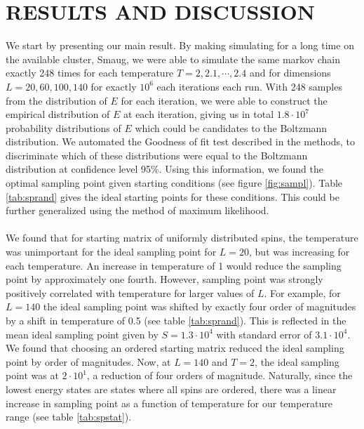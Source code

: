 \documentclass[11pt,english,a4paper]{article}
\begin{document}
\section*{\uppercase{Results and discussion}}
We start by presenting our main result. By making simulating for a long time on the available cluster, Smaug, we were able to simulate the same markov chain exactly 248 times for each temperature $T = 2,2.1,\cdots,2.4$ and for dimensions $L=20,60,100,140$ for exactly $10^6$ each iterations each run. With 248 samples from the distribution of $E$ for each iteration, we were able to construct the empirical distribution of $E$ at each iteration, giving us in total $1.8\cdot 10^7$ probability distributions of $E$ which could be candidates to the Boltzmann distribution. We automated the Goodness of fit test described in the methods, to discriminate which of these distributions were equal to the Boltzmann distribution at confidence level 95\%. Using this information, we found the optimal sampling point given starting conditions (see figure \ref{fig:sampl}). Table \ref{tab:sprand} gives the ideal starting points for these conditions. This could be further generalized using the method of maximum likelihood. \\
\\
We found that for starting matrix of uniformly distributed spins, the temperature was unimportant for the ideal sampling point for $L=20$, but was increasing for each temperature. An increase in temperature of 1 would reduce the sampling point by approximately one fourth. However, sampling point was strongly positively correlated with temperature for larger values of $L$. For example, for $L=140$ the ideal sampling point was shifted by exactly four order of magnitudes by a shift in temperature of 0.5 (see table \ref{tab:sprand}). This is reflected in the mean ideal sampling point given by $S = 1.3\cdot 10^4$ with standard error of $3.1\cdot 10^4$. We found that choosing an ordered starting matrix reduced the ideal sampling point by order of magnitudes. Now, at $L=140$ and $T=2$, the ideal sampling point was at $2 \cdot 10^1$, a reduction of four orders of magnitude. Naturally, since the lowest energy states are states where all spins are ordered, there was a linear increase in sampling point as a function of temperature for our temperature range (see table \ref{tab:spstat}).\\
\\
\end{document}
